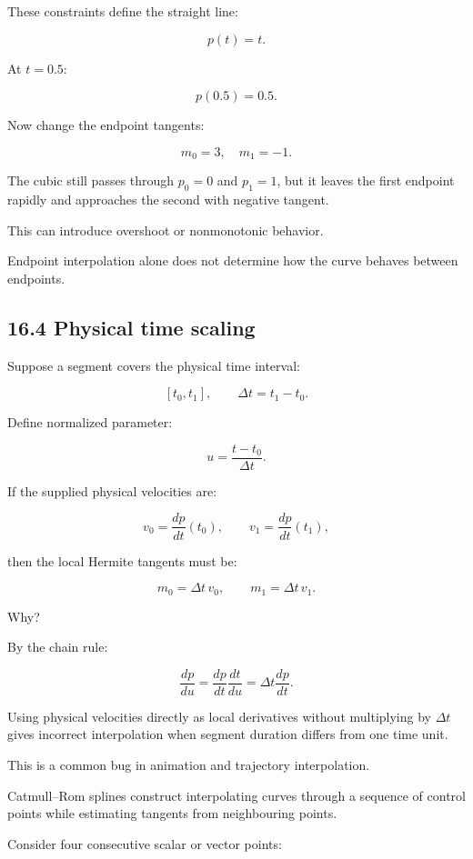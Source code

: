 These constraints define the straight line:

\[ \boxed{p(t)=t}. \]

At \(t=0.5\):

\[ p(0.5)=0.5. \]

Now change the endpoint tangents:

\[ m_0=3,\quad m_1=-1. \]

The cubic still passes through \(p_0=0\) and \(p_1=1\), but it leaves the first endpoint rapidly and approaches the second with negative tangent.

This can introduce overshoot or nonmonotonic behavior.

Endpoint interpolation alone does not determine how the curve behaves between endpoints.

\subsection{16.4 Physical time scaling}\label{02-foundations-ii-ch028-physical-time-scaling}

Suppose a segment covers the physical time interval:

\[ [t_0,t_1], \qquad \Delta t=t_1-t_0. \]

Define normalized parameter:

\[ u=\frac{t-t_0}{\Delta t}. \]

If the supplied physical velocities are:

\[ v_0=\frac{dp}{dt}(t_0), \qquad v_1=\frac{dp}{dt}(t_1), \]

then the local Hermite tangents must be:

\[ \boxed{ m_0=\Delta t\,v_0, \qquad m_1=\Delta t\,v_1 }. \]

Why?

By the chain rule:

\[ \frac{dp}{du} = \frac{dp}{dt}\frac{dt}{du} = \Delta t\frac{dp}{dt}. \]

Using physical velocities directly as local derivatives without multiplying by \(\Delta t\) gives incorrect interpolation when segment duration differs from one time unit.

This is a common bug in animation and trajectory interpolation.

Catmull--Rom splines construct interpolating curves through a sequence of control points while estimating tangents from neighbouring points.

Consider four consecutive scalar or vector points:

